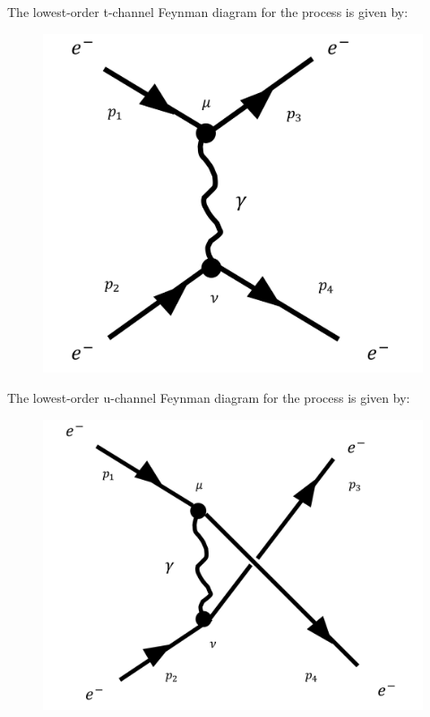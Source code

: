 \documentclass[11pt]{article}
\theoremstyle{definition}
\numberwithin{equation}{section}
\begin{document}
The lowest-order t-channel Feynman diagram for the process is given by:

\begin{figure}[H]
    \centering
    \includegraphics[scale = 0.4]{moller t-channel.png}
\end{figure}


The lowest-order u-channel Feynman diagram for the process is given by:

\begin{figure}[H]
    \centering
    \includegraphics[scale = 0.4]{moller u-channel.png}
\end{figure}
\end{document}
